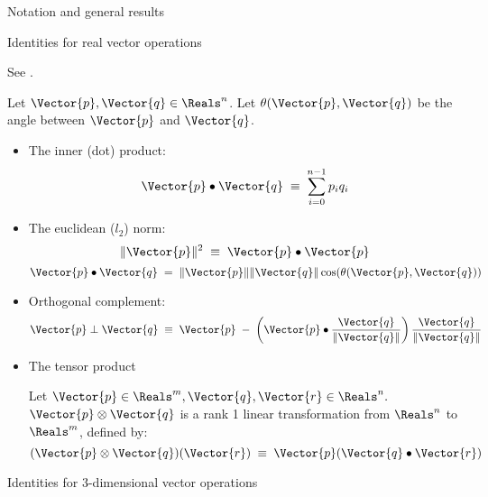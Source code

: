 \begin{plSection}{Notation and general results}
\label{sec:general}
\begin{plSection}{Identities for real vector operations}
\label{sec:RX}

See .

Let $\Vector{p}, \Vector{q} \in \Reals^{n}$.
Let $\theta(\Vector{p},\Vector{q})$ be the angle between $\Vector{p}$ and $\Vector{q}$.

\begin{itemize}
\item The inner (dot) product:
\begin{equation}
\Vector{p} \bullet \Vector{q} \; \equiv \; \sum_{i=0}^{n-1} p_i q_i
\end{equation}

\item The euclidean ($l_2$) norm:
\begin{equation}
\| \Vector{p} \|^2 \; \equiv \; \Vector{p} \bullet \Vector{p}
\end{equation}
\begin{equation}
\Vector{p} \bullet \Vector{q} \; = \; \| \Vector{p} \| \| \Vector{q} \| \cos(\theta(\Vector{p},\Vector{q}))
\end{equation}

\item Orthogonal complement:
\begin{equation}
\Vector{p} \perp \Vector{q} 
\; \equiv \; \Vector{p} \; 
- \; \left( \Vector{p} \bullet 
\frac{\Vector{q}}{\|\Vector{q}\|}\right) 
\frac{\Vector{q}}{\|\Vector{q}\|}
\end{equation}

\item The tensor product

Let $\Vector{p} \in \Reals^m, \Vector{q}, \Vector{r} \in \Reals^n.$
$\Vector{p} \otimes \Vector{q}$ is a rank 1 linear transformation
from $\Reals^n$ to $\Reals^m$, defined by:
\begin{equation}
(\Vector{p} \otimes \Vector{q})(\Vector{r}) \; \equiv \; \Vector{p} (\Vector{q} \bullet \Vector{r})
\end{equation}

\end{itemize}

\end{plSection}%
\begin{plSection}{Identities for 3-dimensional vector operations}
\label{sec:R3X}


\end{plSection}
\end{plSection}

